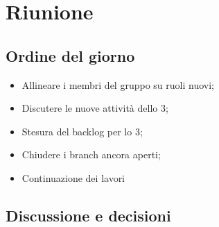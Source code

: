\section{Riunione}
\subsection{Ordine del giorno}
\begin{itemize}
	\item Allineare i membri del gruppo su ruoli nuovi;
	\item Discutere le nuove attività dello  3;
	\item Stesura del backlog per lo  3;
	\item Chiudere i branch ancora aperti;
	\item Continuazione dei lavori
\end{itemize}

\subsection{Discussione e decisioni}
